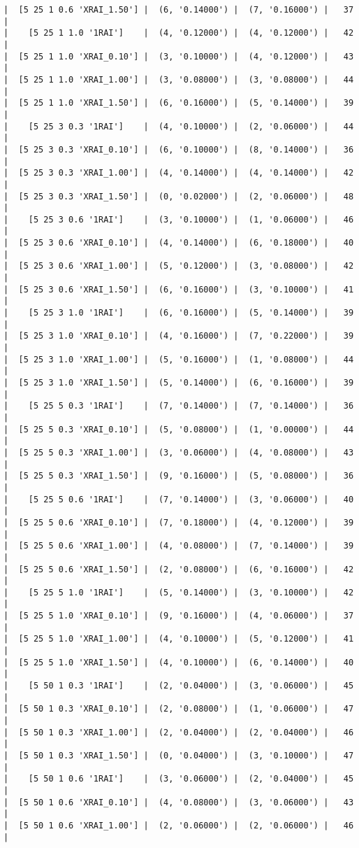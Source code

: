 \documentclass{article}
\begin{document}
\begin{verbatim}
|  [5 25 1 0.6 'XRAI_1.50'] |  (6, '0.14000') |  (7, '0.16000') |   37  |
|    [5 25 1 1.0 '1RAI']    |  (4, '0.12000') |  (4, '0.12000') |   42  |
|  [5 25 1 1.0 'XRAI_0.10'] |  (3, '0.10000') |  (4, '0.12000') |   43  |
|  [5 25 1 1.0 'XRAI_1.00'] |  (3, '0.08000') |  (3, '0.08000') |   44  |
|  [5 25 1 1.0 'XRAI_1.50'] |  (6, '0.16000') |  (5, '0.14000') |   39  |
|    [5 25 3 0.3 '1RAI']    |  (4, '0.10000') |  (2, '0.06000') |   44  |
|  [5 25 3 0.3 'XRAI_0.10'] |  (6, '0.10000') |  (8, '0.14000') |   36  |
|  [5 25 3 0.3 'XRAI_1.00'] |  (4, '0.14000') |  (4, '0.14000') |   42  |
|  [5 25 3 0.3 'XRAI_1.50'] |  (0, '0.02000') |  (2, '0.06000') |   48  |
|    [5 25 3 0.6 '1RAI']    |  (3, '0.10000') |  (1, '0.06000') |   46  |
|  [5 25 3 0.6 'XRAI_0.10'] |  (4, '0.14000') |  (6, '0.18000') |   40  |
|  [5 25 3 0.6 'XRAI_1.00'] |  (5, '0.12000') |  (3, '0.08000') |   42  |
|  [5 25 3 0.6 'XRAI_1.50'] |  (6, '0.16000') |  (3, '0.10000') |   41  |
|    [5 25 3 1.0 '1RAI']    |  (6, '0.16000') |  (5, '0.14000') |   39  |
|  [5 25 3 1.0 'XRAI_0.10'] |  (4, '0.16000') |  (7, '0.22000') |   39  |
|  [5 25 3 1.0 'XRAI_1.00'] |  (5, '0.16000') |  (1, '0.08000') |   44  |
|  [5 25 3 1.0 'XRAI_1.50'] |  (5, '0.14000') |  (6, '0.16000') |   39  |
|    [5 25 5 0.3 '1RAI']    |  (7, '0.14000') |  (7, '0.14000') |   36  |
|  [5 25 5 0.3 'XRAI_0.10'] |  (5, '0.08000') |  (1, '0.00000') |   44  |
|  [5 25 5 0.3 'XRAI_1.00'] |  (3, '0.06000') |  (4, '0.08000') |   43  |
|  [5 25 5 0.3 'XRAI_1.50'] |  (9, '0.16000') |  (5, '0.08000') |   36  |
|    [5 25 5 0.6 '1RAI']    |  (7, '0.14000') |  (3, '0.06000') |   40  |
|  [5 25 5 0.6 'XRAI_0.10'] |  (7, '0.18000') |  (4, '0.12000') |   39  |
|  [5 25 5 0.6 'XRAI_1.00'] |  (4, '0.08000') |  (7, '0.14000') |   39  |
|  [5 25 5 0.6 'XRAI_1.50'] |  (2, '0.08000') |  (6, '0.16000') |   42  |
|    [5 25 5 1.0 '1RAI']    |  (5, '0.14000') |  (3, '0.10000') |   42  |
|  [5 25 5 1.0 'XRAI_0.10'] |  (9, '0.16000') |  (4, '0.06000') |   37  |
|  [5 25 5 1.0 'XRAI_1.00'] |  (4, '0.10000') |  (5, '0.12000') |   41  |
|  [5 25 5 1.0 'XRAI_1.50'] |  (4, '0.10000') |  (6, '0.14000') |   40  |
|    [5 50 1 0.3 '1RAI']    |  (2, '0.04000') |  (3, '0.06000') |   45  |
|  [5 50 1 0.3 'XRAI_0.10'] |  (2, '0.08000') |  (1, '0.06000') |   47  |
|  [5 50 1 0.3 'XRAI_1.00'] |  (2, '0.04000') |  (2, '0.04000') |   46  |
|  [5 50 1 0.3 'XRAI_1.50'] |  (0, '0.04000') |  (3, '0.10000') |   47  |
|    [5 50 1 0.6 '1RAI']    |  (3, '0.06000') |  (2, '0.04000') |   45  |
|  [5 50 1 0.6 'XRAI_0.10'] |  (4, '0.08000') |  (3, '0.06000') |   43  |
|  [5 50 1 0.6 'XRAI_1.00'] |  (2, '0.06000') |  (2, '0.06000') |   46  |

\end{verbatim}
\end{document}
